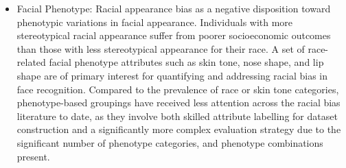 \documentclass[12pt]{article}
\begin{document}
\begin{itemize}
  \item Facial Phenotype: Racial appearance bias as a negative disposition toward phenotypic variations in
  facial appearance. Individuals with more stereotypical racial appearance suffer from poorer socioeconomic outcomes than those with less stereotypical
  appearance for their race. A set of race-related facial phenotype attributes such as skin tone, nose shape, and lip shape are of primary interest
  for quantifying and addressing racial bias in face recognition. Compared to the prevalence of race or skin tone categories, phenotype-based groupings have received less attention
  across the racial bias literature to date, as they involve both skilled attribute labelling for dataset construction and a
  significantly more complex evaluation strategy due to the significant number of phenotype categories, and phenotype
  combinations present.
\end{itemize}
\end{document}
